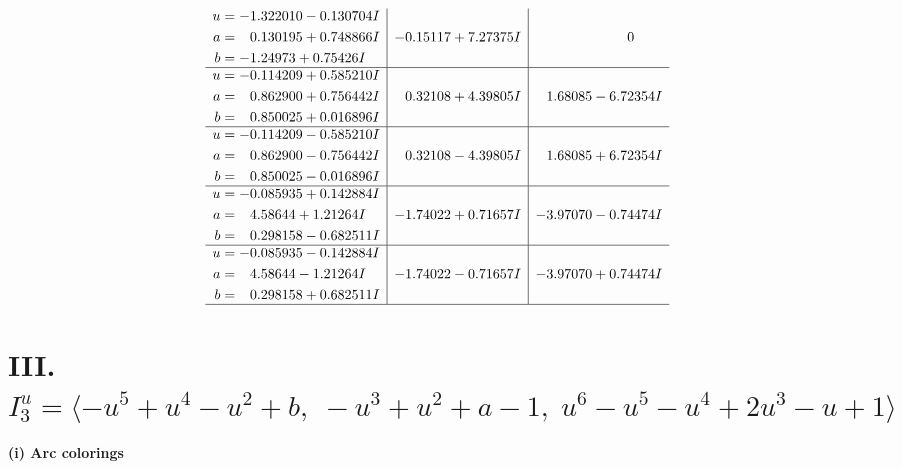 \documentclass[1p]{elsarticle_modified}
\theoremstyle{definition}
\begin{document}
$$\begin{array}{c|c|c}
\begin{aligned}
u &= -1.322010 - 0.130704 I \\
a &= \phantom{-}0.130195 + 0.748866 I \\
b &= -1.24973 + 0.75426 I\end{aligned}
 & -0.15117 + 7.27375 I & \phantom{-0.000000 } 0 \\ \hline\begin{aligned}
u &= -0.114209 + 0.585210 I \\
a &= \phantom{-}0.862900 + 0.756442 I \\
b &= \phantom{-}0.850025 + 0.016896 I\end{aligned}
 & \phantom{-}0.32108 + 4.39805 I & \phantom{-}1.68085 - 6.72354 I \\ \hline\begin{aligned}
u &= -0.114209 - 0.585210 I \\
a &= \phantom{-}0.862900 - 0.756442 I \\
b &= \phantom{-}0.850025 - 0.016896 I\end{aligned}
 & \phantom{-}0.32108 - 4.39805 I & \phantom{-}1.68085 + 6.72354 I \\ \hline\begin{aligned}
u &= -0.085935 + 0.142884 I \\
a &= \phantom{-}4.58644 + 1.21264 I \\
b &= \phantom{-}0.298158 - 0.682511 I\end{aligned}
 & -1.74022 + 0.71657 I & -3.97070 - 0.74474 I \\ \hline\begin{aligned}
u &= -0.085935 - 0.142884 I \\
a &= \phantom{-}4.58644 - 1.21264 I \\
b &= \phantom{-}0.298158 + 0.682511 I\end{aligned}
 & -1.74022 - 0.71657 I & -3.97070 + 0.74474 I\\
 \hline 
 \end{array}$$\newpage\newpage\renewcommand{\arraystretch}{1}
\centering \section*{III. $I^u_{3}= \langle - u^5+u^4- u^2+b,\;- u^3+u^2+a-1,\;u^6- u^5- u^4+2 u^3- u+1 \rangle$}
\flushleft \textbf{(i) Arc colorings}\\
\end{document}
